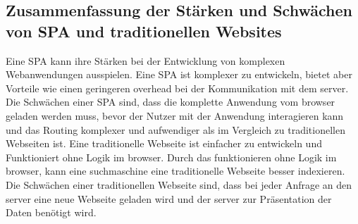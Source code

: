 \subsection*{Zusammenfassung der Stärken und Schwächen von \ac{SPA} und traditionellen Websites}
Eine \ac{SPA} kann ihre Stärken bei der Entwicklung von komplexen Webanwendungen ausspielen.
Eine \ac{SPA} ist komplexer zu entwickeln, bietet aber Vorteile wie einen geringeren \gls{overhead} bei der Kommunikation mit dem \gls{server}.
Die Schwächen einer \ac{SPA} sind, dass die komplette Anwendung vom \gls{browser} geladen werden muss, bevor der Nutzer mit der Anwendung interagieren kann
und das Routing komplexer und aufwendiger als im Vergleich zu traditionellen Webseiten ist.
Eine traditionelle Webseite ist einfacher zu entwickeln und Funktioniert ohne Logik im \gls{browser}.
Durch das funktionieren ohne Logik im \gls{browser}, kann eine \gls{suchmaschine} eine traditionelle Webseite besser indexieren.
Die Schwächen einer traditionellen Webseite sind, dass bei jeder Anfrage an den \gls{server} eine neue Webseite geladen wird und der \gls{server} zur Präsentation der Daten benötigt wird.